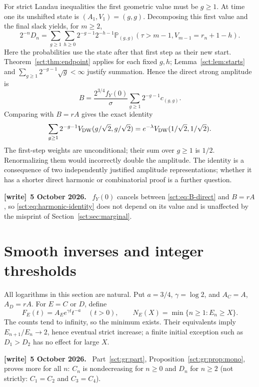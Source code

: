 \documentclass[11pt,letterpaper]{article}
\theoremstyle{definition}\newtheorem{remark}[theorem]{Remark}
\newcommand{\Pp}{\mathbb P}\newcommand{\Ee}{\mathbb E}
\newcommand{\fY}{f_Y}\newcommand{\code}[1]{\texttt{#1}}
\newenvironment{writenote}[1][]{\par\smallskip\begingroup\small
 \noindent\textbf{[write]}\if\relax\detokenize{#1}\relax\else~\textbf{#1.}\fi\ }%
 {\par\endgroup\smallskip}
\begin{document}
For strict Landau inequalities the first geometric value must be $g\ge1$.
At time one its unshifted state is $(A_1,V_1)=(g,g)$.
Decomposing this first value and the final slack yields, for $m\ge2$,
\begin{equation}\label{sct:eq:D-direct}
 2^{-n}D_n=\sum_{g\ge1}\sum_{h\ge0}2^{-g-1}2^{-h-1}
 \Pp_{(g,g)}(\tau>m-1,V_{m-1}=r_n+1-h).
\end{equation}
Here the probabilities use the state after that first step as their new start.
Theorem~\ref{sct:thm:endpoint} applies for each fixed $g,h$;
Lemma~\ref{sct:lem:starts} and $\sum_{g\ge1}2^{-g-1}\sqrt g<\infty$ justify
summation. Hence the direct strong amplitude is
\begin{equation}\label{sct:eq:B-direct}
 B=\frac{2^{3/4}\fY(0)}{\sigma}
     \sum_{g\ge1}2^{-g-1}c_{(g,g)}.
\end{equation}
Comparing with $B=rA$ gives the exact identity
\begin{equation}\label{sct:eq:harmonic-identity}
 \sum_{g\ge1}2^{-g-1}V_{\mathrm{DW}}(g/\sqrt2,g/\sqrt2)
   =e^{-\lambda}V_{\mathrm{DW}}(1/\sqrt2,1/\sqrt2).
\end{equation}
The first-step weights are unconditional; their sum over $g\ge1$ is $1/2$.
Renormalizing them would incorrectly double the amplitude. The identity is a
consequence of two independently justified amplitude representations; whether
it has a shorter direct harmonic or combinatorial proof is a further question.
\begin{writenote}[5 October 2026]
$\fY(0)$ cancels between \eqref{sct:eq:B-direct} and $B=rA$, so \eqref{sct:eq:harmonic-identity} does not depend on its value and is unaffected by the misprint of Section~\ref{sct:sec:marginal}.
\end{writenote}

\section{Smooth inverses and integer thresholds}\label{sct:sec:inverse}
All logarithms in this section are natural. Put $a=3/4$, $\gamma=\log2$,
and $A_C=A$, $A_D=rA$. For $E=C$ or $D$, define
\[
 F_E(t)=A_E e^{\gamma t}t^{-a}\quad(t>0),\qquad
 N_E(X)=\min\{n\ge1:E_n\ge X\}.
\]
The counts tend to infinity, so the minimum exists. Their equivalents imply
$E_{n+1}/E_n\to2$, hence eventual strict increase; a finite initial exception
such as $D_1>D_2$ has no effect for large $X$.
\begin{writenote}[5 October 2026]
Part~\ref{sct:gr:part}, Proposition~\ref{sct:gr:prop:mono}, proves more for all $n$: $C_n$ is nondecreasing for $n\ge0$ and $D_n$ for $n\ge2$ (not strictly: $C_1=C_2$ and $C_3=C_4$).
\end{writenote}
\end{document}
